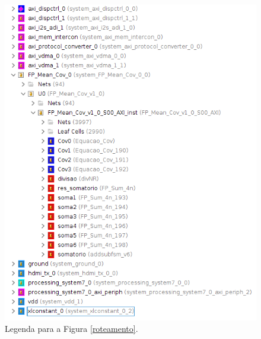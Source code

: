 \begin{figure}[!h]
	\centering
	\includegraphics[keepaspectratio=true,scale=0.35]{figuras/legenda_roteamento.png}
	\caption{Legenda para a Figura \ref{roteamento}.}
	\label{legenda_rot}
\end{figure}


